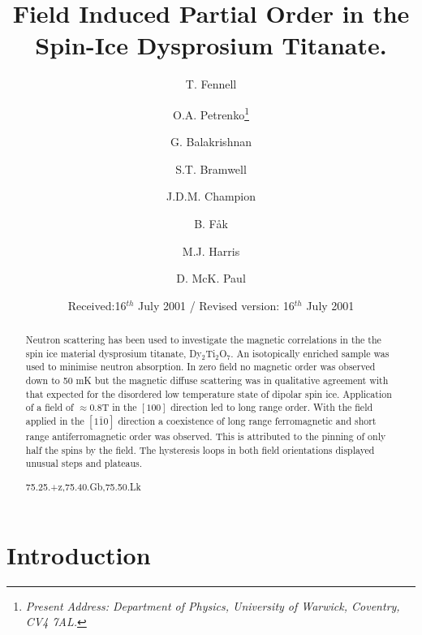 \documentclass[global,twocolumn]{svjour}
\begin{document}
\title{Field Induced Partial Order in the Spin-Ice Dysprosium Titanate.}
\author{T. Fennell \and O.A. Petrenko\thanks{\emph{Present Address: Department of Physics, University of Warwick, Coventry, CV4 7AL.}} 
\and  G. Balakrishnan \and
S.T. Bramwell\and J.D.M. Champion \and B. F{\aa}k
\and
M.J. Harris \and D. McK. Paul}


\date{Received:16$^{th}$ July 2001  / Revised version: 16$^{th}$ July
2001}
%
\maketitle
\begin{abstract}
Neutron scattering has been used to investigate the 
magnetic correlations in the the spin ice
material dysprosium titanate, Dy$_2$Ti$_2$O$_7$. 
An isotopically enriched sample was used to minimise
neutron absorption.  In zero field no
magnetic order was observed down to 50 mK but the magnetic 
diffuse scattering was in
qualitative agreement with that expected for
the disordered low temperature state of dipolar spin ice. 
Application of a field of $\approx 0.8$T in the
$[100]$ direction led to long range order.  With the field  
applied in the $[1\bar{1}0]$ direction a coexistence of long range
ferromagnetic and short range antiferromagnetic order was observed. 
This is attributed to the pinning of only half the 
spins by the field.  The hysteresis loops in both field orientations 
displayed unusual steps and plateaus. 

75.25.+z,75.40.Gb,75.50.Lk
 \end{abstract}
%
\section{Introduction}
\label{intro}
\end{document}
